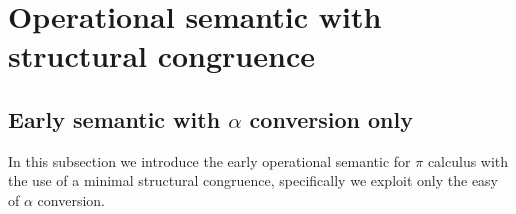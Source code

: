 %     
% 
% 
% 
% 
% 
\section{Operational semantic with structural congruence}

\subsection{Early semantic with $\alpha$ conversion only}
In this subsection we introduce the early operational semantic for $\pi$ calculus with the use of a minimal structural congruence, specifically we exploit only the easy of $\alpha$ conversion.

